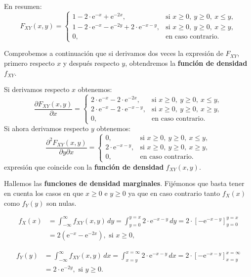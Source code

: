 \documentclass[]{book}
\begin{document}
En resumen:
\[
F_{XY}(x,y)=\begin{cases}
1-2\cdot\mathrm{e}^{-x}+\mathrm{e}^{-2x}, & \mbox{si }x\geq 0,\ y\geq 0,\ x\leq y,\\
1-2\cdot\mathrm{e}^{-x}-\mathrm{e}^{-2y}+2\cdot\mathrm{e}^{-x-y}, & \mbox{si }x\geq 0,\ y\geq 0,\ x\geq y,\\
0, & \mbox{en caso contrario.}
\end{cases}
\]

Comprobemos a continuación que si derivamos dos veces la expresión de \(F_{XY}\), primero respecto \(x\) y después respecto \(y\), obtendremos la \textbf{función de densidad} \(f_{XY}\).

Si derivamos respecto \(x\) obtenemos:
\[
\frac{\partial F_{XY}(x,y)}{\partial x}=\begin{cases}
2\cdot\mathrm{e}^{-x}-2\cdot\mathrm{e}^{-2x}, & \mbox{si }x\geq 0,\ y\geq 0,\ x\leq y,\\
2\cdot\mathrm{e}^{-x}-2\cdot\mathrm{e}^{-x-y}, & \mbox{si }x\geq 0,\ y\geq 0,\ x\geq y,\\
0, & \mbox{en caso contrario.}
\end{cases}
\]
Si ahora derivamos respecto \(y\) obtenemos:
\[
\frac{\partial^2 F_{XY}(x,y)}{\partial y\partial x}=\begin{cases}
0, & \mbox{si }x\geq 0,\ y\geq 0,\ x\leq y,\\
2\cdot\mathrm{e}^{-x-y}, & \mbox{si }x\geq 0,\ y\geq 0,\ x\geq y,\\
0, & \mbox{en caso contrario.}
\end{cases}
\]
expresión que coincide con la \textbf{función de densidad} \(f_{XY}(x,y)\).

Hallemos las \textbf{funciones de densidad marginales}. Fijémonos que basta tener en cuenta los casos en que \(x\geq 0\) e \(y\geq 0\) ya que en caso contrario tanto \(f_X(x)\) como \(f_Y(y)\) son nulas.

\[
\begin{array}{rl}
f_X(x) &=   \int_{-\infty}^{\infty} f_{XY}(x,y)\, dy =\int_{y=0}^{y=x}2\cdot\mathrm{e}^{-x-y}\, dy = 2\cdot\left[-\mathrm{e}^{-x-y}\right]_{y=0}^{y=x} \\ &=   2\left(\mathrm{e}^{-x}-\mathrm{e}^{-2x}\right),\mbox{ si }x\geq 0,
\end{array}
\]

\[
\begin{array}{rl}
f_Y(y) & =  \int_{-\infty}^{\infty} f_{XY}(x,y)\, dx =\int_{x=y}^{x=\infty}2\cdot\mathrm{e}^{-x-y}\, dx = 2\cdot\left[-\mathrm{e}^{-x-y}\right]_{x=y}^{x=\infty}\\ &= 2\cdot\mathrm{e}^{-2y}, \mbox{ si }y\geq 0.
\end{array}
\]
\end{document}
